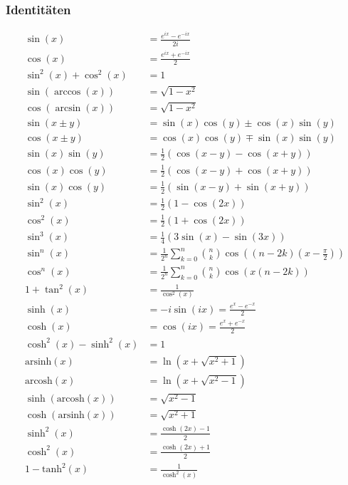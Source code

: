 \documentclass[8pt, a4paper, landscape, fleqn]{scrartcl}
\begin{document}
\begin{multicols*}{3}
				\subsubsection{Identitäten}
					\vspace{-7pt}
					\begin{align*}
						\sin(x)&=\frac{e^{ix}-e^{-ix}}{2i}\\
						\cos(x)&=\frac{e^{ix}+e^{-ix}}{2}\\
						\sin^2(x)+\cos^2(x)&=1\\
						\sin(\arccos(x))&=\sqrt{1-x^2}\\
						\cos(\arcsin(x))&=\sqrt{1-x^2}\\
						\sin(x\pm y)&=\sin(x)\cos(y) \pm \cos(x)\sin(y)\\
						\cos(x \pm y)&=\cos(x)\cos(y) \mp \sin(x)\sin(y)\\
						\sin(x)\sin(y)&=\frac{1}{2}(\cos(x-y)-\cos(x+y))\\
						\cos(x)\cos(y)&=\frac{1}{2}(\cos(x-y)+\cos(x+y))\\
						\sin(x)\cos(y)&=\frac{1}{2}(\sin(x-y)+\sin(x+y))\\
						\sin^2(x)&=\frac{1}{2}(1-\cos(2x))\\
						\cos^2(x)&=\frac{1}{2}(1+\cos(2x))\\
						\sin^3(x)&=\frac{1}{4}(3\sin(x)-\sin(3x))\\
						\sin^n(x)&=\frac{1}{2^n}\sum_{k=0}^{n}\binom{n}{k}\cos\left((n-2k)(x-\frac{\pi}{2})\right)\\
						\cos^n(x)&=\frac{1}{2^n}\sum_{k=0}^{n}\binom{n}{k}\cos\left(x(n-2k)\right)\\
						1+\tan^2(x)&=\frac{1}{\cos^2(x)}\\	
						\sinh(x)&=-i\sin(ix)=\frac{e^x-e^{-x}}{2}\\
						\cosh(x)&=\cos(ix)=\frac{e^x+e^{-x}}{2}\\
						\cosh^2(x)-\sinh^2(x)&=1\\
						\text{arsinh}(x)&=\ln\left(x+\sqrt{x^2+1}\right)\\
						\text{arcosh}(x)&=\ln\left(x+\sqrt{x^2-1}\right)\\
						\sinh(\text{arcosh}(x))&=\sqrt{x^2-1}\\
						\cosh(\text{arsinh}(x))&=\sqrt{x^2+1}\\
						\sinh^2(x)&=\frac{\cosh(2x)-1}{2}\\
						\cosh^2(x)&=\frac{\cosh(2x)+1}{2}\\
						1-\text{tanh}^2(x)&=\frac{1}{\cosh^2(x)}
					\end{align*}

\end{multicols*}
\end{document}
